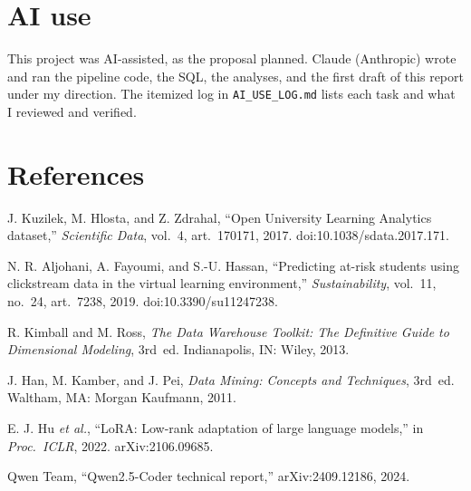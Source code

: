 \documentclass[10pt,letterpaper]{article}
\renewcommand{\tt}[1]{\texttt{#1}}
\begin{document}
\section*{AI use}
This project was AI-assisted, as the proposal planned. Claude (Anthropic) wrote and ran the pipeline code, the
SQL, the analyses, and the first draft of this report under my direction. The itemized log in
\tt{AI\_USE\_LOG.md} lists each task and what I reviewed and verified.

\section*{References}
\begin{enumerate}[leftmargin=1.6em,label={[\arabic*]},topsep=2pt,itemsep=1pt]
\item J. Kuzilek, M. Hlosta, and Z. Zdrahal, ``Open University Learning Analytics dataset,'' \emph{Scientific Data}, vol.~4, art.~170171, 2017. doi:10.1038/sdata.2017.171.
\item N. R. Aljohani, A. Fayoumi, and S.-U. Hassan, ``Predicting at-risk students using clickstream data in the virtual learning environment,'' \emph{Sustainability}, vol.~11, no.~24, art.~7238, 2019. doi:10.3390/su11247238.
\item R. Kimball and M. Ross, \emph{The Data Warehouse Toolkit: The Definitive Guide to Dimensional Modeling}, 3rd~ed. Indianapolis, IN: Wiley, 2013.
\item J. Han, M. Kamber, and J. Pei, \emph{Data Mining: Concepts and Techniques}, 3rd~ed. Waltham, MA: Morgan Kaufmann, 2011.
\item E. J. Hu \emph{et al.}, ``LoRA: Low-rank adaptation of large language models,'' in \emph{Proc.\ ICLR}, 2022. arXiv:2106.09685.
\item Qwen Team, ``Qwen2.5-Coder technical report,'' arXiv:2409.12186, 2024.
\end{enumerate}
\end{document}
